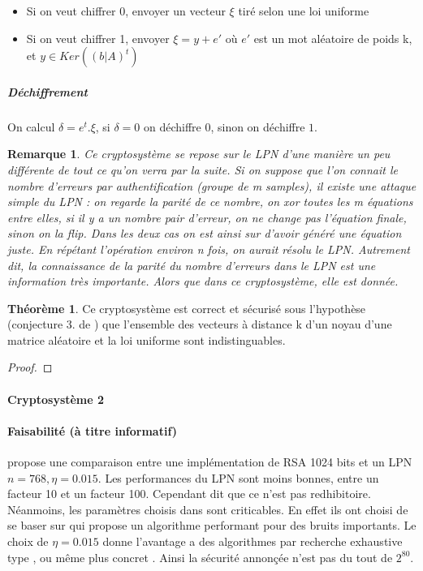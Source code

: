 \documentclass{article}		%
\theoremstyle{definition}
\newtheorem{theo}{Théorème}
\theoremstyle{plain}
\theoremstyle{plain}
\theoremstyle{plain}
\newtheorem{remark}{Remarque}
\theoremstyle{plain}
\begin{document}
\begin{itemize}
\item Si on veut chiffrer 0, envoyer un vecteur $\xi$ tiré selon une loi
uniforme
\item Si on veut chiffrer 1, envoyer $\xi=y+e'$ où $e'$ est un mot aléatoire
de poids k, et $y\in Ker((b|A)^t)$
\end{itemize}

\subparagraph{Déchiffrement}
On calcul $\delta= e^t.\xi$, si $\delta=0$ on déchiffre $0$, sinon on
déchiffre $1$.


\begin{remark}
Ce cryptosystème se repose sur le LPN d'une manière un peu différente de
tout ce qu'on verra par la suite. Si on suppose que l'on connait le
nombre d'erreurs par authentification (groupe de m samples), il existe une attaque simple du
LPN : on regarde la parité de ce nombre, on xor toutes les m équations
entre elles, si il y a un nombre pair d'erreur, on ne change pas
l'équation finale, sinon on la flip. Dans les deux cas on est ainsi sur
d'avoir généré une équation juste. En répétant l'opération environ n
fois, on aurait résolu le LPN. Autrement dit, la connaissance de la
parité du nombre d'erreurs dans le LPN est une information très
importante. Alors que dans ce cryptosystème, elle est donnée.
\end{remark}

\begin{theo}
Ce cryptosystème est correct et sécurisé sous l'hypothèse (conjecture 3.
de \cite{Alekh}) que l'ensemble
des vecteurs à distance k d'un noyau d'une matrice aléatoire et la loi
uniforme sont indistinguables. 
\end{theo}
\begin{proof}
\end{proof}
\paragraph{Cryptosystème 2}

\paragraph{Faisabilité (à titre informatif)}
\cite{Dam} propose une comparaison entre une implémentation de RSA 1024
bits et un LPN $n=768,\eta=0.015$. Les performances du LPN sont moins
bonnes, entre un facteur 10 et un facteur 100. Cependant \cite{Dam} dit
que ce n'est pas redhibitoire. Néanmoins, les paramètres choisis dans
\cite{Dam} sont criticables. En effet ils ont choisi de se baser sur
\cite{LF} qui propose un algorithme performant pour des bruits
importants. Le choix de $\eta=0.015$ donne l'avantage a des algorithmes
par recherche exhaustive type \cite{Valiant},\cite{Grigo} ou même plus
concret \cite{Gol}. Ainsi la sécurité annonçée n'est pas du tout de
$2^{80}$.
\end{document}
